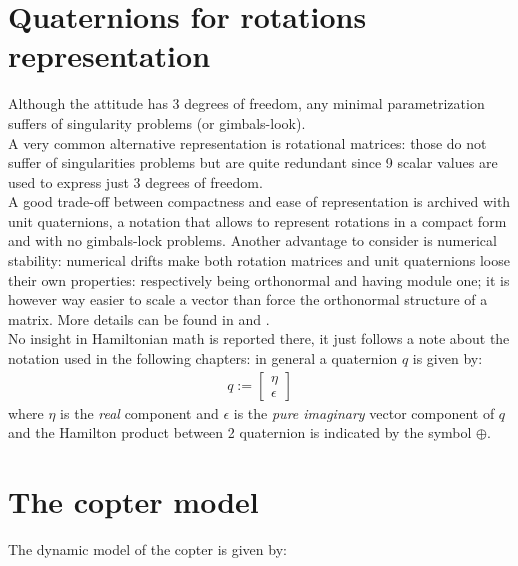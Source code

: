 \section{Quaternions for rotations representation}
Although the attitude has 3 degrees of freedom, any minimal parametrization suffers of singularity problems (or gimbals-look).\\
A very common alternative representation is rotational matrices: those do not suffer of singularities problems but are quite  redundant since 9 scalar values are used to express just 3 degrees of freedom.\\
A good trade-off between compactness and ease of representation is archived with unit quaternions, a notation that allows to represent rotations in a compact form and with no gimbals-lock problems. Another advantage to consider is numerical stability: numerical drifts make both rotation matrices and unit quaternions loose their own properties: respectively being orthonormal and having module one; it is however way easier to scale a vector than force the orthonormal structure of a matrix. More details can be found in \cite{bib:quat} and \cite{bib:rotquat}.\\
No insight in Hamiltonian math is reported there, it just follows a note about the notation used in the following chapters: in general a quaternion $q$ is given by:
\begin{equation} \label{eq:coptermodelmat}
\begin{split}
q := \begin{bmatrix}
\eta\\
\epsilon
\end{bmatrix}
\end{split}
\end{equation}
where $\eta$ is the \emph{real} component and $\epsilon$ is the \emph{pure imaginary} vector component of $q$ and the Hamilton product between 2 quaternion is indicated by the symbol $\oplus$.

\section{The copter model}
The dynamic model of the copter is given by:

